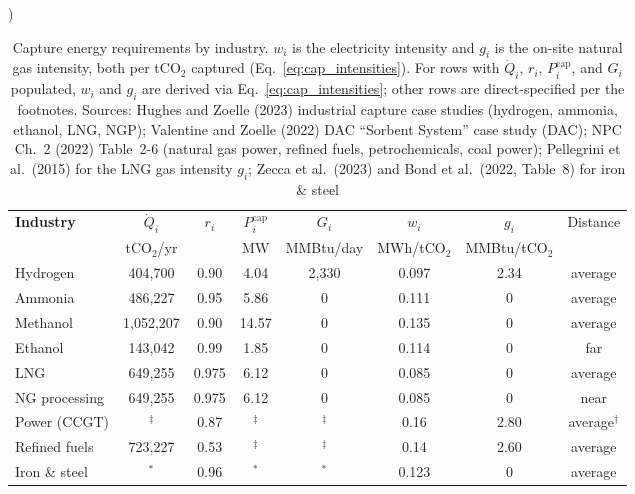 \documentclass[11pt]{article}
\newcommand{\cotwo}{\ensuremath{\mathrm{CO_2}}}
\begin{document}
\begin{table}[htbp]
\centering
\caption{Capture energy requirements by industry.
$w_i$ is the electricity intensity and $g_i$ is the on-site natural gas intensity, both per t\cotwo{} captured (Eq.~\ref{eq:cap_intensities}).
For rows with $\dot{Q}_i$, $r_i$, $P_i^{\text{cap}}$, and $G_i$ populated, $w_i$ and $g_i$ are derived via Eq.~\eqref{eq:cap_intensities}; other rows are direct-specified per the footnotes.
Sources: Hughes and Zoelle (2023) industrial capture case studies (hydrogen, ammonia, ethanol, LNG, NGP); Valentine and Zoelle (2022) DAC ``Sorbent System'' case study (DAC); NPC Ch.~2 (2022) Table~2-6 (natural gas power, refined fuels, petrochemicals, coal power); Pellegrini et al.\ (2015) for the LNG gas intensity $g_i$; Zecca et al.\ (2023) and Bond et al.\ (2022, Table~8) for iron \& steel})
\label{tab:capture_energy}
\footnotesize
\setlength{\tabcolsep}{4pt}
\begin{tabular}{@{}lccccccc@{}}
\toprule
\textbf{Industry} & $\dot{Q}_i$ & $r_i$ & $P_i^{\text{cap}}$ & $G_i$ & $w_i$ & $g_i$ & Distance \\
  & \scriptsize t\cotwo{}/yr & & \scriptsize MW
  & \scriptsize MMBtu/day
  & \scriptsize MWh/t\cotwo{}
  & \scriptsize MMBtu/t\cotwo{} & \\
\midrule
Hydrogen        & 404,700       & 0.90  & 4.04          & 2,330         & 0.097 & 2.34  & average \\
Ammonia         & 486,227       & 0.95  & 5.86          & 0             & 0.111 & 0     & average \\
Methanol        & 1,052,207     & 0.90  & 14.57         & 0             & 0.135 & 0     & average \\
Ethanol         & 143,042       & 0.99  & 1.85          & 0             & 0.114 & 0     & far \\
LNG             & 649,255       & 0.975 & 6.12          & 0             & 0.085 & 0     & average \\
NG processing   & 649,255       & 0.975 & 6.12          & 0             & 0.085 & 0     & near \\
Power (CCGT)    & $^{\ddagger}$ & 0.87  & $^{\ddagger}$ & $^{\ddagger}$ & 0.16  & 2.80  & average$^{\dagger}$ \\
Refined fuels   & 723,227       & 0.53  & $^{\ddagger}$ & $^{\ddagger}$ & 0.14  & 2.60  & average \\
Iron \& steel   & $^{\ast}$     & 0.96  & $^{\ast}$     & $^{\ast}$     & 0.123 & 0     & average \\

\end{tabular}
\end{table}
\end{document}
